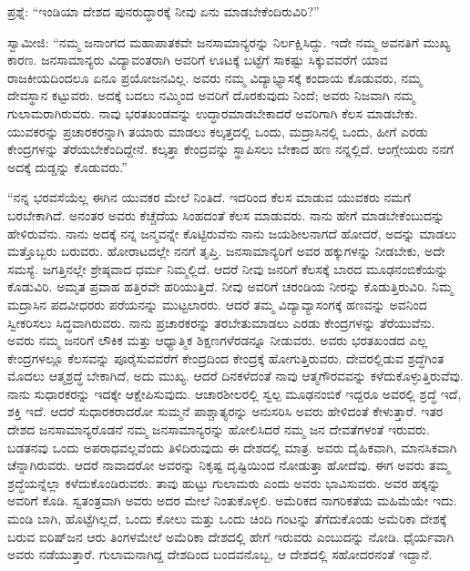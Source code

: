 \vskip 0.1cm

ಪ್ರಶ್ನೆ: “ಇಂಡಿಯಾ ದೇಶದ ಪುನರುದ್ಧಾರಕ್ಕೆ ನೀವು ಏನು ಮಾಡಬೇಕೆಂದಿರುವಿರಿ?”

\vskip 0.1cm

ಸ್ವಾಮೀಜಿ: “ನಮ್ಮ ಜನಾಂಗದ ಮಹಾಪಾತಕವೇ ಜನಸಾಮಾನ್ಯರನ್ನು ನಿರ್ಲಕ್ಷಿಸಿದ್ದು. ಇದೇ ನಮ್ಮ ಅವನತಿಗೆ ಮುಖ್ಯ ಕಾರಣ. ಜನಸಾಮಾನ್ಯರು ವಿದ್ಯಾವಂತರಾಗಿ ಅವರಿಗೆ ಊಟಕ್ಕೆ ಬಟ್ಟೆಗೆ ಸಾಕಷ್ಟು ಸಿಕ್ಕುವವರೆಗೆ ಯಾವ ರಾಜಕೀಯದಿಂದಲೂ ಏನೂ ಪ್ರಯೋಜನವಿಲ್ಲ. ಅವರು ನಮ್ಮ ವಿದ್ಯಾಭ್ಯಾಸಕ್ಕೆ ಕಂದಾಯ ಕೊಡುವರು, ನಮ್ಮ ದೇವಸ್ಥಾನ ಕಟ್ಟುವರು. ಅದಕ್ಕೆ ಬದಲು ನಮ್ಮಿಂದ ಅವರಿಗೆ ದೊರಕುವುದು ನಿಂದೆ; ಅವರು ನಿಜವಾಗಿ ನಮ್ಮ ಗುಲಾಮರಾಗಿರುವರು. ನಾವು ಭರತಖಂಡವನ್ನು ಉದ್ಧಾರಮಾಡಬೇಕಾದರೆ ಅವರಿಗಾಗಿ ಕೆಲಸ ಮಾಡಬೇಕು. ಯುವಕರನ್ನು ಪ್ರಚಾರಕರನ್ನಾಗಿ ತಯಾರು ಮಾಡಲು ಕಲ್ಕತ್ತದಲ್ಲಿ ಒಂದು, ಮದ್ರಾಸಿನಲ್ಲಿ ಒಂದು, ಹೀಗೆ ಎರಡು ಕೇಂದ್ರಗಳನ್ನು ತೆರೆಯಬೇಕೆಂದಿದ್ದೇನೆ. ಕಲ್ಕತ್ತಾ ಕೇಂದ್ರವನ್ನು ಸ್ಥಾಪಿಸಲು ಬೇಕಾದ ಹಣ ನನ್ನಲ್ಲಿದೆ. ಆಂಗ್ಲೇಯರು ನನಗೆ ಅದಕ್ಕೆ ದುಡ್ಡನ್ನು ಕೊಡುವರು.”

\vskip 0.1cm

“ನನ್ನ ಭರವಸೆಯೆಲ್ಲ ಈಗಿನ ಯುವಕರ ಮೇಲೆ ನಿಂತಿದೆ. ಇದರಿಂದ ಕೆಲಸ ಮಾಡುವ ಯುವಕರು ನಮಗೆ ಬರಬೇಕಾಗಿದೆ. ಅನಂತರ ಅವರು ಕೆಚ್ಚೆದೆಯ ಸಿಂಹದಂತೆ ಕೆಲಸ ಮಾಡುವರು. ನಾನು ಹೇಗೆ ಮಾಡಬೇಕೆಂಬುದನ್ನು ಹೇಳಿರುವೆನು. ನಾನು ಅದಕ್ಕೆ ನನ್ನ ಜನ್ಮವನ್ನೇ ಕೊಟ್ಟಿರುವೆನು ನಾನು ಜಯಶೀಲನಾಗದೆ ಹೋದರೆ, ಅದನ್ನು ಮಾಡಲು ಮತ್ತೊಬ್ಬರು ಬರುವರು. ಹೋರಾಟದಲ್ಲೇ ನನಗೆ ತೃಪ್ತಿ. ಜನಸಾಮಾನ್ಯರಿಗೆ ಅವರ ಹಕ್ಕುಗಳನ್ನು ನೀಡಬೇಕು, ಅದೇ ಸಮಸ್ಯೆ. ಜಗತ್ತಿನಲ್ಲೇ ಶ್ರೇಷ್ಠವಾದ ಧರ್ಮ ನಿಮ್ಮಲ್ಲಿದೆ. ಆದರೆ ನೀವು ಜನರಿಗೆ ಕೆಲಸಕ್ಕೆ ಬಾರದ ಮೂಢನಂಬಿಕೆಯನ್ನು ಕೊಡುವಿರಿ. ಅಮೃತ ಪ್ರವಾಹ ಹತ್ತಿರವೇ ಹರಿಯುತ್ತಿದೆ. ನೀವು ಅವರಿಗೆ ಚರಂಡಿಯ ನೀರನ್ನು ಕೊಡುತ್ತಿರುವಿರಿ. ನಿಮ್ಮ ಮದ್ರಾಸಿನ ಪದವೀಧರರು ಪರೆಯನನ್ನು ಮುಟ್ಟಲಾರರು. ಆದರೆ ತಮ್ಮ ವಿದ್ಯಾವ್ಯಾಸಂಗಕ್ಕೆ ಹಣವನ್ನು ಅವನಿಂದ ಸ್ವೀಕರಿಸಲು ಸಿದ್ಧವಾಗಿರುವರು. ನಾನು ಪ್ರಚಾರಕರನ್ನು ತರಬೇತುಮಾಡಲು ಎರಡು ಕೇಂದ್ರಗಳನ್ನು ತೆರೆಯುವೆನು. ಅವರು ನಮ್ಮ ಜನರಿಗೆ ಲೌಕಿಕ ಮತ್ತು ಆಧ್ಯಾತ್ಮಿಕ ಶಿಕ್ಷಣಗಳೆರಡನ್ನೂ ನೀಡುವರು. ಅವರು ಭರತಖಂಡದ ಎಲ್ಲ ಕೇಂದ್ರಗಳಲ್ಲೂ ಕೆಲಸವನ್ನು ಪೂರೈಸುವವರೆಗೆ ಕೇಂದ್ರದಿಂದ ಕೇಂದ್ರಕ್ಕೆ ಹೋಗುತ್ತಿರುವರು. ದೇವರಲ್ಲಿಡುವ ಶ್ರದ್ಧೆಗಿಂತ ಮೊದಲು ಆತ್ಮಶ್ರದ್ಧೆ ಬೇಕಾಗಿದೆ, ಅದು ಮುಖ್ಯ. ಆದರೆ ದಿನಕಳೆದಂತೆ ನಾವು ಆತ್ಮಗೌರವವನ್ನು ಕಳೆದುಕೊಳ್ಳುತ್ತಿರುವೆವು. ನಾನು ಸುಧಾರಕರನ್ನು ಇದಕ್ಕೇ ಆಕ್ಷೇಪಿಸುವುದು. ಆಚಾರಶೀಲರಲ್ಲಿ ಸ್ವಲ್ಪ ಮೂಢನಂಬಿಕೆ ಇದ್ದರೂ ಅವರಲ್ಲಿ ಶ್ರದ್ಧೆ ಇದೆ, ಶಕ್ತಿ ಇದೆ. ಆದರೆ ಸುಧಾರಕರಾದರೋ ಸುಮ್ಮನೆ ಪಾಶ್ಚಾತ್ಯರನ್ನು ಅನುಸರಿಸಿ ಅವರು ಹೇಳಿದಂತೆ ಕೇಳುತ್ತಾರೆ. ಇತರ ದೇಶದ ಜನಸಾಮಾನ್ಯರೊಡನೆ ನಮ್ಮ ಜನಸಾಮಾನ್ಯರನ್ನು ಹೋಲಿಸಿದರೆ ನಮ್ಮ ಜನ ದೇವತೆಗಳಂತೆ ಇರುವರು. ಬಡತನವು ಒಂದು ಅಪರಾಧವಲ್ಲವೆಂದು ತಿಳಿದಿರುವುದು ಈ ದೇಶದಲ್ಲಿ ಮಾತ್ರ. ಅವರು ದೈಹಿಕವಾಗಿ, ಮಾನಸಿಕವಾಗಿ ಚೆನ್ನಾಗಿರುವರು. ಆದರೆ ನಾವಾದರೋ ಅವರನ್ನು ನಿಕೃಷ್ಟ ದೃಷ್ಟಿಯಿಂದ ನೋಡುತ್ತಾ ಹೋದೆವು. ಈಗ ಅವರು ತಮ್ಮ ಶ್ರದ್ಧೆಯನ್ನೆಲ್ಲಾ ಕಳೆದುಕೊಂಡಿರುವರು. ತಾವು ಹುಟ್ಟು ಗುಲಾಮರು ಎಂದು ಅವರು ಭಾವಿಸುವರು. ಅವರ ಹಕ್ಕನ್ನು ಅವರಿಗೆ ಕೊಡಿ. ಸ್ವತಂತ್ರವಾಗಿ ಅವರು ಅದರ ಮೇಲೆ ನಿಂತುಕೊಳ್ಳಲಿ. ಅಮೆರಿಕದ ನಾಗರಿಕತೆಯ ಮಹಿಮೆಯೇ ಇದು. ಮಂಡಿ ಬಾಗಿ, ಹೊಟ್ಟೆಗಿಲ್ಲದೆ, ಒಂದು ಕೋಲು ಮತ್ತು ಒಂದು ಚಿಂದಿ ಗಂಟನ್ನು ತೆಗೆದುಕೊಂಡು ಅಮೆರಿಕಾ ದೇಶಕ್ಕೆ ಬರುವ ಐರಿಷ್​ ಜನ ಆರು ತಿಂಗಳಮೇಲೆ ಅಮೆರಿಕಾ ದೇಶದಲ್ಲಿ ಹೇಗೆ ಇರುವರು ಎಂಬುದನ್ನು ನೋಡಿ. ಧೈರ್ಯವಾಗಿ ಅವರು ನಡೆಯುತ್ತಾರೆ. ಗುಲಾಮನಾಗಿದ್ದ ದೇಶದಿಂದ ಬಂದವನೊಬ್ಬ, ಆ ದೇಶದಲ್ಲಿ ಸಹೋದರನಂತೆ ಇದ್ದಾನೆ.

